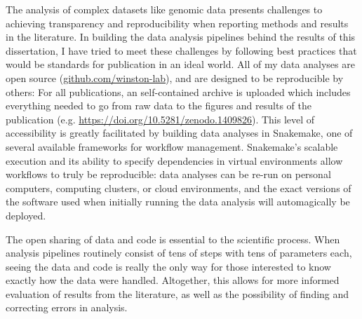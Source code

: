 The analysis of complex datasets like genomic data presents challenges to achieving transparency and reproducibility when reporting methods and results in the literature.
In building the data analysis pipelines behind the results of this dissertation, I have tried to meet these challenges by following best practices that would be standards for publication in an ideal world.
All of my data analyses are open source (\href{https://github.com/winston-lab}{github.com/winston-lab}), and are designed to be reproducible by others: For all publications, an self-contained archive is uploaded which includes everything needed to go from raw data to the figures and results of the publication (e.g. \url{https://doi.org/10.5281/zenodo.1409826}).
This level of accessibility is greatly facilitated by building data analyses in Snakemake, one of several available frameworks for workflow management.
Snakemake's scalable execution and its ability to specify dependencies in virtual environments allow workflows to truly be reproducible: data analyses can be re-run on personal computers, computing clusters, or cloud environments, and the exact versions of the software used when initially running the data analysis will automagically be deployed.

The open sharing of data and code is essential to the scientific process.
When analysis pipelines routinely consist of tens of steps with tens of parameters each, seeing the data and code is really the only way for those interested to know exactly how the data were handled.
Altogether, this allows for more informed evaluation of results from the literature, as well as the possibility of finding and correcting errors in analysis.

\clearpage

\begingroup
    \singlespacing
    
\endgroup

